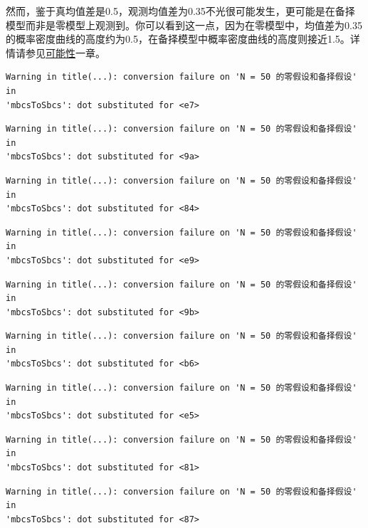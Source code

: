 \documentclass[
  letterpaper,
  DIV=11,
  numbers=noendperiod]{scrreprt}
\begin{document}
然而，鉴于真均值差是0.5，观测均值差为0.35不光很可能发生，更可能是在备择模型而非是零模型上观测到。你可以看到这一点，因为在零模型中，均值差为0.35的概率密度曲线的高度约为0.5，在备择模型中概率密度曲线的高度则接近1.5。详情请参见\protect\hyperlink{likettest}{可能性}一章。

\begin{verbatim}
Warning in title(...): conversion failure on 'N = 50 的零假设和备择假设' in
'mbcsToSbcs': dot substituted for <e7>
\end{verbatim}

\begin{verbatim}
Warning in title(...): conversion failure on 'N = 50 的零假设和备择假设' in
'mbcsToSbcs': dot substituted for <9a>
\end{verbatim}

\begin{verbatim}
Warning in title(...): conversion failure on 'N = 50 的零假设和备择假设' in
'mbcsToSbcs': dot substituted for <84>
\end{verbatim}

\begin{verbatim}
Warning in title(...): conversion failure on 'N = 50 的零假设和备择假设' in
'mbcsToSbcs': dot substituted for <e9>
\end{verbatim}

\begin{verbatim}
Warning in title(...): conversion failure on 'N = 50 的零假设和备择假设' in
'mbcsToSbcs': dot substituted for <9b>
\end{verbatim}

\begin{verbatim}
Warning in title(...): conversion failure on 'N = 50 的零假设和备择假设' in
'mbcsToSbcs': dot substituted for <b6>
\end{verbatim}

\begin{verbatim}
Warning in title(...): conversion failure on 'N = 50 的零假设和备择假设' in
'mbcsToSbcs': dot substituted for <e5>
\end{verbatim}

\begin{verbatim}
Warning in title(...): conversion failure on 'N = 50 的零假设和备择假设' in
'mbcsToSbcs': dot substituted for <81>
\end{verbatim}

\begin{verbatim}
Warning in title(...): conversion failure on 'N = 50 的零假设和备择假设' in
'mbcsToSbcs': dot substituted for <87>
\end{verbatim}
\end{document}
